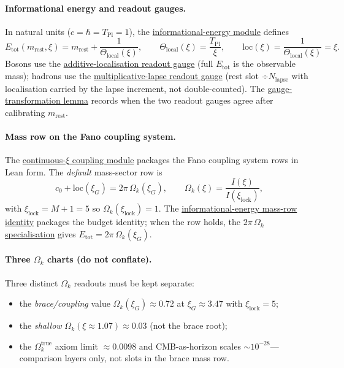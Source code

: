 \documentclass[11pt]{article}
\begin{document}
\paragraph{Informational energy and readout gauges.}
In natural units ($c=\hbar=T_{\mathrm{Pl}}=1$), the
\hyperref[lean:info-energy]{informational-energy module}
defines
\[
  E_{\mathrm{tot}}(m_{\mathrm{rest}},\xi) = m_{\mathrm{rest}} + \frac{1}{\Theta_{\mathrm{local}}(\xi)},
  \qquad \Theta_{\mathrm{local}}(\xi)=\frac{T_{\mathrm{Pl}}}{\xi},
  \qquad \mathrm{loc}(\xi)=\frac{1}{\Theta_{\mathrm{local}}(\xi)}=\xi.
\]
Bosons use the
\hyperref[lean:additive-loc]{additive-localisation readout
gauge} (full $E_{\mathrm{tot}}$ is the observable mass);
hadrons use the
\hyperref[lean:lapse-readout]{multiplicative-lapse readout
gauge} (rest slot $\div N_{\mathrm{lapse}}$ with localisation
carried by the lapse increment, not double-counted). The
\hyperref[lean:gauge-transform]{gauge-transformation lemma}
records when the two readout gauges agree after calibrating
$m_{\mathrm{rest}}$.

\paragraph{Mass row on the Fano coupling system.}
The
\hyperref[lean:cont-xi-coupling]{continuous-$\xi$ coupling
module} packages the Fano coupling system rows in Lean form.
The \emph{default} mass-sector row is
\[
  c_0 + \mathrm{loc}(\xi_G) = 2\pi\,\Omega_k(\xi_G),
  \qquad
  \Omega_k(\xi)=\frac{I(\xi)}{I(\xi_{\mathrm{lock}})},
\]
with $\xi_{\mathrm{lock}}=M+1=5$ so
$\Omega_k(\xi_{\mathrm{lock}})=1$. The
\hyperref[lean:info-energy-row]{informational-energy mass-row
identity} packages the budget identity; when the row holds, the
\hyperref[lean:info-energy-row-twopi]{$2\pi\,\Omega_k$
specialisation} gives $E_{\mathrm{tot}}=2\pi\,\Omega_k(\xi_G)$.

\paragraph{Three $\Omega_k$ charts (do not conflate).}
Three distinct $\Omega_k$ readouts must be kept separate:
\begin{itemize}[leftmargin=2em]
\item the \emph{brace/coupling} value $\Omega_k(\xi_G)\approx 0.72$ at
  $\xi_G\approx 3.47$ with $\xi_{\mathrm{lock}}=5$;
\item the \emph{shallow} $\Omega_k(\xi\approx 1.07)\approx 0.03$
  (not the brace root);
\item the \emph{$\Omega_k^{\mathrm{true}}$} axiom limit
  $\approx 0.0098$ and CMB-as-horizon scales $\sim 10^{-28}$---
  comparison layers only, not slots in the brace mass row.
\end{itemize}
\end{document}
